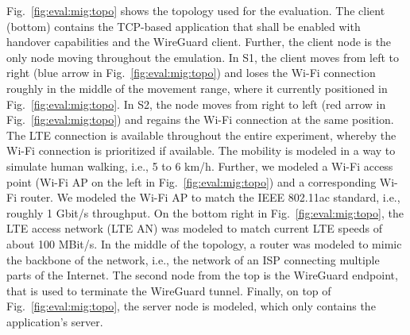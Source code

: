 Fig.~\ref{fig:eval:mig:topo} shows the topology used for the evaluation.
The client (bottom) contains the TCP-based application that shall be enabled with handover capabilities and the WireGuard client.
Further, the client node is the only node moving throughout the emulation.
In S1, the client moves from left to right (blue arrow in Fig.~\ref{fig:eval:mig:topo}) and loses the Wi-Fi connection roughly in the middle of the movement range, where it currently positioned in Fig.~\ref{fig:eval:mig:topo}. 
In S2, the node moves from right to left (red arrow in Fig.~\ref{fig:eval:mig:topo}) and regains the Wi-Fi connection at the same position.
The LTE connection is available throughout the entire experiment, whereby the Wi-Fi connection is prioritized if available.
The mobility is modeled in a way to simulate human walking, i.e., 5 to 6 km/h.
Further, we modeled a Wi-Fi access point (Wi-Fi AP on the left in Fig.~\ref{fig:eval:mig:topo}) and a corresponding Wi-Fi router.
We modeled the Wi-Fi AP to match the IEEE 802.11ac standard, i.e., roughly 1 Gbit/s throughput.
On the bottom right in Fig.~\ref{fig:eval:mig:topo}, the LTE access network (LTE AN) was modeled to match current LTE speeds of about 100 MBit/s.
In the middle of the topology, a router was modeled to mimic the backbone of the network, i.e., the network of an ISP connecting multiple parts of the Internet.
The second node from the top is the WireGuard endpoint, that is used to terminate the WireGuard tunnel.
Finally, on top of Fig.~\ref{fig:eval:mig:topo}, the server node is modeled, which only contains the application's server.


